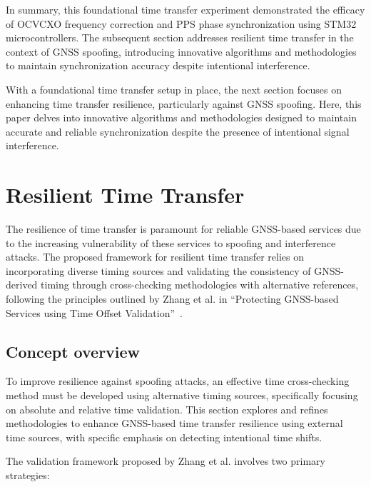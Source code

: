 \documentclass[12pt, a4paper]{extarticle}
\begin{document}
In summary, this foundational time transfer experiment demonstrated the
efficacy of OCVCXO frequency correction and PPS phase synchronization using
STM32 microcontrollers. The subsequent section addresses resilient time
transfer in the context of GNSS spoofing, introducing innovative algorithms and
methodologies to maintain synchronization accuracy despite intentional
interference.

With a foundational time transfer setup in place, the next section focuses on
enhancing time transfer resilience, particularly against GNSS spoofing. Here,
this paper delves into innovative algorithms and methodologies designed to
maintain accurate and reliable synchronization despite the presence of
intentional signal interference.

\pagebreak
\section{Resilient Time Transfer}\label{sec:resilient-time-transfer}

The resilience of time transfer is paramount for reliable GNSS-based services
due to the increasing vulnerability of these services to spoofing and
interference attacks. The proposed framework for resilient time transfer relies
on incorporating diverse timing sources and validating the consistency of
GNSS-derived timing through cross-checking methodologies with alternative
references, following the principles outlined by Zhang et al. in ``Protecting
GNSS-based Services using Time Offset Validation''~\cite{time-offset,celllocate}.

\subsection{Concept overview}

To improve resilience against spoofing attacks, an effective time
cross-checking method must be developed using alternative timing sources,
specifically focusing on absolute and relative time validation. This section
explores and refines methodologies to enhance GNSS-based time transfer
resilience using external time sources, with specific emphasis on detecting
intentional time shifts.

The validation framework proposed by Zhang et al. involves two primary strategies:
\end{document}
